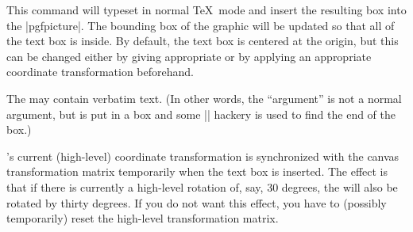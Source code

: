\begin{command}{\pgftext{}}
  This command will typeset  in normal \TeX\ mode and
  insert the resulting box into the |{pgfpicture}|. The bounding box
  of the graphic will be updated so that all of the text box is
  inside. By default, the text box is centered at the origin, but this
  can be changed either by giving appropriate  or by
  applying an appropriate coordinate transformation beforehand.

  The  may contain verbatim text. (In other words, the
   ``argument'' is not a normal argument, but is put in a
  box and some |\aftergroup| hackery is used to find the end of the
  box.)

  \pgfname's current (high-level) coordinate transformation is
  synchronized with the canvas transformation matrix temporarily
  when the text box is inserted. The effect is that if there is
  currently a high-level rotation of, say, 30 degrees, the 
  will also be rotated by thirty degrees. If you do not want this
  effect, you have to (possibly temporarily) reset the high-level
  transformation matrix.


\end{command}
